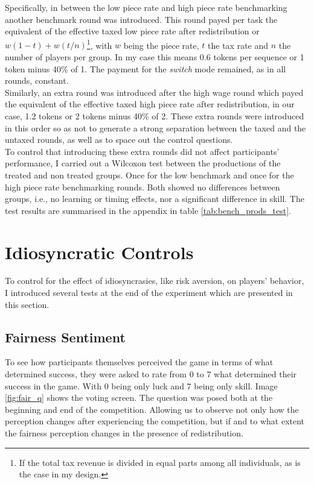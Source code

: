     Specifically, in between the low piece rate and high piece rate benchmarking another benchmark round was introduced. This round payed per task the equivalent of the effective taxed low piece rate after redistribution or $w(1-t)+ w(t/n)$\footnote{If the total tax revenue is divided in equal parts among all individuals, as is the case in my design.}, with $w$ being the piece rate, $t$ the tax rate and $n$ the number of players per group. In my case this means 0.6 tokens per sequence or 1 token minus 40\% of 1. The payment for the \textit{switch} mode remained, as in all rounds, constant.\\
    
    Similarly, an extra round was introduced after the high wage round which payed the equivalent of the effective taxed high piece rate after redistribution, in our case, 1.2 tokens or 2 tokens minus 40\% of 2. These extra rounds were introduced in this order so as not to generate a strong separation between the taxed and the untaxed rounds, as well as to space out the control questions. \\ 
    
    To control that introducing these extra rounds did not affect participants' performance, I carried out a Wilcoxon test between the productions of the treated and non treated groups. Once for the low benchmark and once for the high piece rate benchmarking rounds. Both showed no differences between groups, i.e., no learning or timing effects, nor a significant difference in skill. The test results are summarised in the appendix in table \ref{tab:bench_prods_test}.
    
    \section{Idiosyncratic Controls}
    
    To control for the effect of idiosyncrasies, like risk aversion, on players' behavior, I introduced several tests at the end of the experiment which are presented in this section. 
    
    \subsection{Fairness Sentiment}
    
    To see how participants themselves perceived the game in terms of what determined success, they were asked to rate from 0 to 7 what determined their success in the game. With 0 being only luck and 7 being only skill. Image \ref{fig:fair_q} shows the voting screen. The question was posed both at the beginning and end of the competition. Allowing us to observe not only how the perception changes after experiencing the competition, but if and to what extent the fairness perception changes in the presence of redistribution.\\
    
